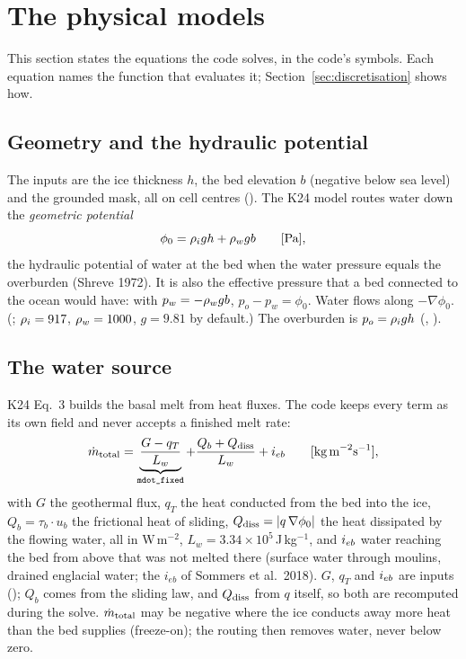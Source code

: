 \section{The physical models}\label{sec:physics}

This section states the equations the code solves, in the code's symbols. Each equation names the function that
evaluates it; Section~\ref{sec:discretisation} shows how.

\subsection{Geometry and the hydraulic potential}
The inputs are the ice thickness $h$, the bed elevation $b$ (negative below sea level) and the grounded mask, all
on cell centres (). The K24 model routes water down the \emph{geometric potential}
\begin{equation}\label{eq:phi0}
\phi_0 = {\rho_i} g h + {\rho_w} g b \qquad[\text{Pa}],
\end{equation}
the hydraulic potential of water at the bed when the water pressure equals the overburden (Shreve 1972). It is
also the effective pressure that a bed connected to the ocean would have: with $p_w = -{\rho_w} g b$,
$p_o - p_w = \phi_0$. Water flows along $-\nabla\phi_0$. (; ${\rho_i} = 917$, ${\rho_w} = 1000$,
$g = 9.81$ by default.) The overburden is $p_o = {\rho_i} g h$ (, ).

\subsection{The water source}
K24 Eq.~3 builds the basal melt from heat fluxes. The code keeps every term as its own field and never accepts a
finished melt rate:
\begin{equation}\label{eq:source}
\dot m_{\rm total} = \underbrace{\frac{G - q_T}{L_w}}_{\texttt{mdot\_fixed}} + \frac{Q_b + Q_{\rm diss}}{L_w} + {i_{eb}}
\qquad[\text{kg\,m}^{-2}\text{s}^{-1}],
\end{equation}
with $G$ the geothermal flux, $q_T$ the heat conducted from the bed into the ice, $Q_b = \tau_b\cdot u_b$ the frictional
heat of sliding, $Q_{\rm diss} = |q\,\nabla\phi_0|$ the heat dissipated by the flowing water, all in W\,m$^{-2}$,
$L_w = 3.34\times10^5$\,J\,kg$^{-1}$, and ${i_{eb}}$ water reaching the bed from above that was not melted there
(surface water through moulins, drained englacial water; the $i_{eb}$ of Sommers et al.\ 2018). $G$, $q_T$ and
${i_{eb}}$ are inputs (); $Q_b$ comes from the sliding law, and $Q_{\rm diss}$ from $q$ itself,
so both are recomputed during the solve. $\dot m_{\rm total}$ may be negative where the ice conducts away more heat
than the bed supplies (freeze-on); the routing then removes water, never below zero.

